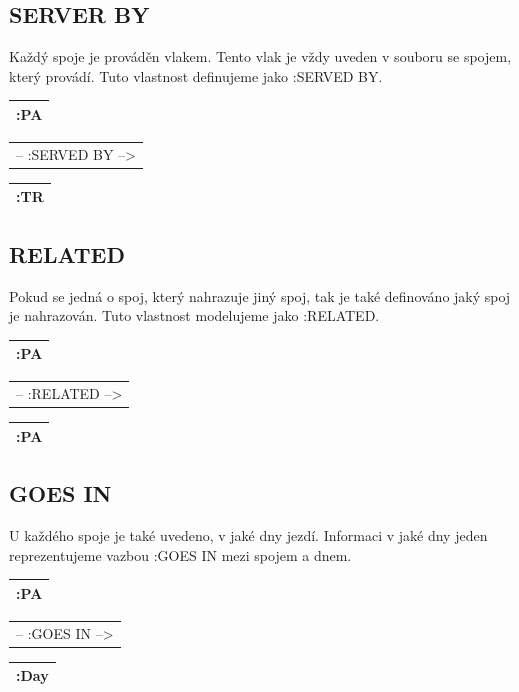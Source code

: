 \documentclass[10pt,xcolor=pdflatex,dvipsnames,table,oneside]{book}
\begin{document}
\subsection{SERVER BY}
Každý spoje je prováděn vlakem. Tento vlak je vždy uveden v souboru se spojem, který provádí. Tuto vlastnost
definujeme jako :SERVED BY.

\vspace{1em}
\begin{tabular}{|l|}
    \hline
    :PA \\
    \hline
\end{tabular}
\begin{tabular}{c}
    -- :SERVED BY --> \\
\end{tabular}
\begin{tabular}{|l|}
    \hline
    :TR \\
    \hline
\end{tabular}

\subsection{RELATED}
Pokud se jedná o spoj, který nahrazuje jiný spoj, tak je také definováno jaký spoj je nahrazován. Tuto vlastnost
modelujeme jako :RELATED.

\vspace{1em}
\begin{tabular}{|l|}
    \hline
    :PA \\
    \hline
\end{tabular}
\begin{tabular}{c}
    -- :RELATED --> \\
\end{tabular}
\begin{tabular}{|l|}
    \hline
    :PA \\
    \hline
\end{tabular}

\subsection{GOES IN}
U každého spoje je také uvedeno, v jaké dny jezdí. Informaci v jaké dny jeden reprezentujeme vazbou :GOES IN mezi spojem a dnem.

\vspace{1em}
\begin{tabular}{|l|}
    \hline
    :PA \\
    \hline
\end{tabular}
\begin{tabular}{c}
    -- :GOES IN --> \\
\end{tabular}
\begin{tabular}{|l|}
    \hline
    :Day \\
    \hline
\end{tabular}
\end{document}
